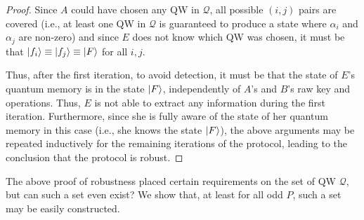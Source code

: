 \begin{proof}
Since $A$ could have chosen any QW in $\mathcal{Q}$, all possible $(i,j)$ pairs are covered (i.e., at least one QW in $\mathcal{Q}$ is guaranteed to produce a state where $\alpha_i$ and $\alpha_j$ are non-zero) and since $E$ does not know which QW was chosen, it must be that $| f_i \rangle \equiv | f_j \rangle \equiv | F \rangle$ for all $i,j$.

Thus, after the first iteration, to avoid detection, it must be that the state of $E$'s quantum memory is in the state $| F \rangle$, independently of $A$'s and $B$'s raw key and operations.  Thus, $E$ is not able to extract any information during the first iteration. Furthermore, since she is fully aware of the state of her quantum memory in this case (i.e., she knows the state $| F \rangle$), the above arguments may be repeated inductively for the remaining iterations of the protocol, leading to the conclusion that the protocol is robust.
\end{proof}

The above proof of robustness placed certain requirements on the set of QW $\mathcal{Q}$, but can such a set even exist?  We show that, at least for all odd $P$, such a set may be easily constructed.

